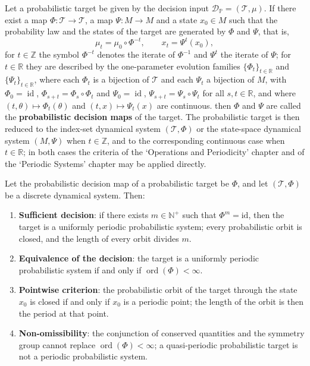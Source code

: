 \begin{definition}\label{def:prob_periodization}
Let a probabilistic target be given by the decision input $\mathcal D_{\mathbb P}=(\mathcal T,\mu)$. If there exist a map $\Phi:\mathcal T\to\mathcal T$, a map $\Psi:M\to M$ and a state $x_0\in M$ such that the probability law and the states of the target are generated by $\Phi$ and $\Psi$, that is,
\[
\mu_t=\mu_0\circ \Phi^{-t},\qquad x_t=\Psi^t(x_0),
\]
for $t\in\mathbb Z$ the symbol $\Phi^{-t}$ denotes the iterate of $\Phi^{-1}$ and $\Psi^t$ the iterate of $\Psi$; for $t\in\mathbb R$ they are described by the one-parameter evolution families $\{\Phi_t\}_{t\in\mathbb R}$ and $\{\Psi_t\}_{t\in\mathbb R}$, where each $\Phi_t$ is a bijection of $\mathcal T$ and each $\Psi_t$ a bijection of $M$, with $\Phi_0=\operatorname{id}$, $\Phi_{s+t}=\Phi_s\circ\Phi_t$ and $\Psi_0=\operatorname{id}$, $\Psi_{s+t}=\Psi_s\circ\Psi_t$ for all $s,t\in\mathbb R$, and where $(t,\theta)\mapsto\Phi_t(\theta)$ and $(t,x)\mapsto\Psi_t(x)$ are continuous.
then $\Phi$ and $\Psi$ are called the \textbf{probabilistic decision maps} of the target. The probabilistic target is then reduced to the index-set dynamical system $(\mathcal T,\Phi)$ or the state-space dynamical system $(M,\Psi)$ when $t\in\mathbb Z$, and to the corresponding continuous case when $t\in\mathbb R$; in both cases the criteria of the `Operations and Periodicity' chapter and of the `Periodic Systems' chapter may be applied directly.
\end{definition}

\begin{theorem}\label{thm:prob_periodicity_decision}
Let the probabilistic decision map of a probabilistic target be $\Phi$, and let $(\mathcal T,\Phi)$ be a discrete dynamical system. Then:
\begin{enumerate}[label=(\Alph*)]
    \item \textbf{Sufficient decision}: if there exists $m\in\mathbb N^+$ such that $\Phi^m=\mathrm{id}$, then the target is a uniformly periodic probabilistic system; every probabilistic orbit is closed, and the length of every orbit divides $m$.
    \item \textbf{Equivalence of the decision}: the target is a uniformly periodic probabilistic system if and only if $\operatorname{ord}(\Phi)<\infty$.
    \item \textbf{Pointwise criterion}: the probabilistic orbit of the target through the state $x_0$ is closed if and only if $x_0$ is a periodic point; the length of the orbit is then the period at that point.
    \item \textbf{Non-omissibility}: the conjunction of conserved quantities and the symmetry group cannot replace $\operatorname{ord}(\Phi)<\infty$; a quasi-periodic probabilistic target is not a periodic probabilistic system.
\end{enumerate}
\end{theorem}


